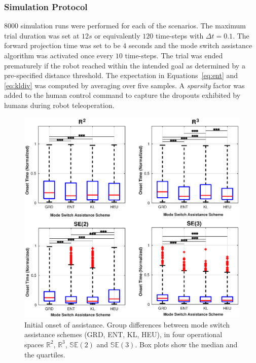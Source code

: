 \documentclass[conference]{IEEEtran}
\begin{document}
\subsubsection{Simulation Protocol}
8000 simulation runs were performed for each of the scenarios. 
The maximum trial duration was set at $12s$ or equivalently $120$ time-steps with $\Delta t = 0.1$. The forward projection time was set to be $4$ seconds and the mode switch assistance algorithm was activated once every $10$ time-steps. The trial was ended prematurely if the robot reached within the intended goal as determined by a pre-specified distance threshold. The expectation in Equations~\ref{eq:ent} and \ref{eq:kldiv} was computed by averaging over five samples.  A \textit{sparsity} factor was added to the human control command to capture the dropouts exhibited by humans during robot teleoperation. 
 \begin{figure}[t!]
	\centering
	\includegraphics[width= 1.\hsize, height=0.3\vsize]{./figures/initial_alpha.eps}
	\vspace{-0.75cm}
	\caption{Initial onset of assistance. Group differences between mode switch assistance schemes (GRD, ENT, KL, HEU), in four operational spaces $\mathbb{R}^2$, $\mathbb{R}^3$, $\mathbb{SE}(2)$ and $\mathbb{SE}(3)$. Box plots show the median and the quartiles.} 
	\label{fig:initial_alpha}
\end{figure}
\end{document}

